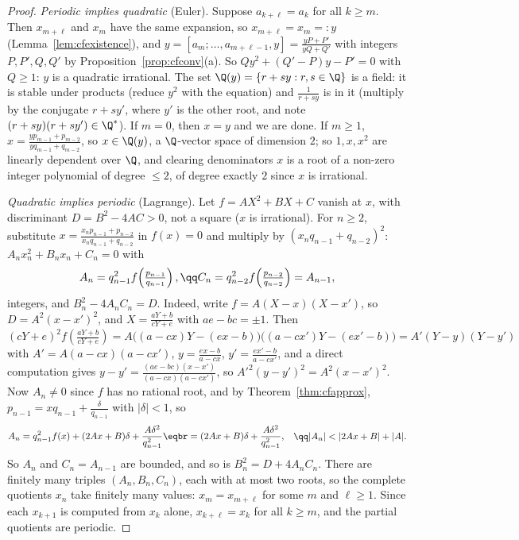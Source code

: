 \begin{proof}
\emph{Periodic implies quadratic} (Euler). Suppose $a_{k+\ell}=a_k$ for all $k\ge m$. Then $x_{m+\ell}$ and $x_m$ have the same expansion, so $x_{m+\ell}=x_m=:y$ (Lemma~\ref{lem:cfexistence}), and $y=[a_m;\dots,a_{m+\ell-1},y]=\frac{yP+P'}{yQ+Q'}$ with integers $P,P',Q,Q'$ by Proposition~\ref{prop:cfconv}(a). So $Qy^2+(Q'-P)y-P'=0$ with $Q\ge1$: $y$ is a quadratic irrational. The set $\Q(y)=\{r+sy:r,s\in\Q\}$ is a field: it is stable under products (reduce $y^2$ with the equation) and $\frac1{r+sy}$ is in it (multiply by the conjugate $r+sy'$, where $y'$ is the other root, and note $(r+sy)(r+sy')\in\Q^*$). If $m=0$, then $x=y$ and we are done. If $m\ge1$, $x=\frac{yp_{m-1}+p_{m-2}}{yq_{m-1}+q_{m-2}}$, so $x\in\Q(y)$, a $\Q$-vector space of dimension $2$; so $1,x,x^2$ are linearly dependent over $\Q$, and clearing denominators $x$ is a root of a non-zero integer polynomial of degree $\le2$, of degree exactly $2$ since $x$ is irrational.

\emph{Quadratic implies periodic} (Lagrange). Let $f=AX^2+BX+C$ vanish at $x$, with discriminant $D=B^2-4AC>0$, not a square ($x$ is irrational). For $n\ge2$, substitute $x=\frac{x_np_{n-1}+p_{n-2}}{x_nq_{n-1}+q_{n-2}}$ in $f(x)=0$ and multiply by $(x_nq_{n-1}+q_{n-2})^2$: $A_nx_n^2+B_nx_n+C_n=0$ with
\[
\begin{gathered}A_n=q_{n-1}^2f\!\left(\tfrac{p_{n-1}}{q_{n-1}}\right),\qq C_n=q_{n-2}^2f\!\left(\tfrac{p_{n-2}}{q_{n-2}}\right)=A_{n-1},\end{gathered}
\]
integers, and $B_n^2-4A_nC_n=D$. Indeed, write $f=A(X-x)(X-x')$, so $D=A^2(x-x')^2$, and $X=\frac{aY+b}{cY+e}$ with $ae-bc=\pm1$. Then $(cY+e)^2f\!\left(\frac{aY+b}{cY+e}\right)=A\bigl((a-cx)Y-(ex-b)\bigr)\bigl((a-cx')Y-(ex'-b)\bigr)=A'(Y-y)(Y-y')$ with $A'=A(a-cx)(a-cx')$, $y=\frac{ex-b}{a-cx}$, $y'=\frac{ex'-b}{a-cx'}$, and a direct computation gives $y-y'=\frac{(ae-bc)(x-x')}{(a-cx)(a-cx')}$, so $A'^2(y-y')^2=A^2(x-x')^2$. Now $A_n\ne0$ since $f$ has no rational root, and by Theorem~\ref{thm:cfapprox}, $p_{n-1}=xq_{n-1}+\frac{\delta}{q_{n-1}}$ with $|\delta|<1$, so
\[
\begin{gathered}\begin{aligned}A_n&=q_{n-1}^2f(x)+(2Ax+B)\delta+\frac{A\delta^2}{q_{n-1}^2}\eqbr=(2Ax+B)\delta+\frac{A\delta^2}{q_{n-1}^2},\end{aligned}\qq|A_n|<|2Ax+B|+|A|.\end{gathered}
\]
So $A_n$ and $C_n=A_{n-1}$ are bounded, and so is $B_n^2=D+4A_nC_n$. There are finitely many triples $(A_n,B_n,C_n)$, each with at most two roots, so the complete quotients $x_n$ take finitely many values: $x_m=x_{m+\ell}$ for some $m$ and $\ell\ge1$. Since each $x_{k+1}$ is computed from $x_k$ alone, $x_{k+\ell}=x_k$ for all $k\ge m$, and the partial quotients are periodic.
\end{proof}

